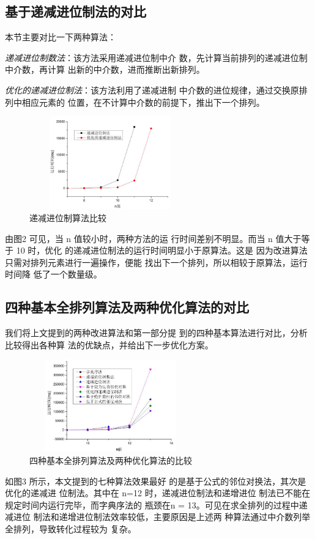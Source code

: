 \documentclass[6pt, twocolumn]{ctexart}
\begin{document}
\subsection{基于递减进位制法的对比}

本节主要对比一下两种算法：

\emph{递减进位制数法}：该方法采用递减进位制中介 数，先计算当前排列的递减进位制中介数，再计算 出新的中介数，进而推断出新排列。

\emph{优化的递减进位制法}：该方法利用了递减进制 中介数的进位规律，通过交换原排列中相应元素的 位置，在不计算中介数的前提下，推出下一个排列。
\begin{figure}
\centering	

\caption{递减进位制算法比较}
\includegraphics[width=7cm, height=4cm]{2.png}	
\end{figure}
由图2 可见，当 n 值较小时，两种方法的运 行时间差别不明显。而当 n 值大于等于 10 时，优化 的递减进位制法的运行时间明显小于原算法。这是 因为改进算法只需对排列元素进行一遍操作，便能 找出下一个排列，所以相较于原算法，运行时间降 低了一个数量级。


\subsection{四种基本全排列算法及两种优化算法的对比}
我们将上文提到的两种改进算法和第一部分提 到的四种基本算法进行对比，分析比较得出各种算 法的优缺点，并给出下一步优化方案。

\begin{figure}
\centering	

\caption{四种基本全排列算法及两种优化算法的比较}
\includegraphics[width=7cm, height=4cm]{3.png}	
\end{figure}
如图3 所示，本文提到的七种算法效果最好 的是基于公式的邻位对换法，其次是优化的递减进 位制法。其中在 n=12 时，递减进位制法和递增进位 制法已不能在规定时间内运行完毕，而字典序法的 瓶颈在n = 13。可见在求全排列的过程中递减进位 制法和递增进位制法效率较低，主要原因是上述两 种算法通过中介数列举全排列，导致转化过程较为 复杂。
\end{document}
